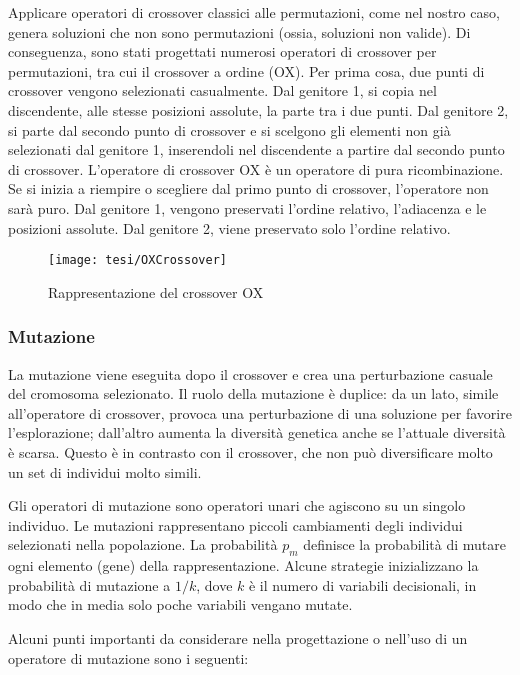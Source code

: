 Applicare operatori di crossover classici alle permutazioni, come nel nostro caso, genera soluzioni che non sono permutazioni (ossia, soluzioni non valide). Di conseguenza, sono stati progettati numerosi operatori di crossover per permutazioni, tra cui il crossover a ordine (OX). Per prima cosa, due punti di crossover vengono selezionati casualmente. Dal genitore 1, si copia nel discendente, alle stesse posizioni assolute, la parte tra i due punti. Dal genitore 2, si parte dal secondo punto di crossover e si scelgono gli elementi non già selezionati dal genitore 1, inserendoli nel discendente a partire dal secondo punto di crossover. L'operatore di crossover OX è un operatore di pura ricombinazione. Se si inizia a riempire o scegliere dal primo punto di crossover, l'operatore non sarà puro. Dal genitore 1, vengono preservati l'ordine relativo, l'adiacenza e le posizioni assolute. Dal genitore 2, viene preservato solo l'ordine relativo.

\begin{figure}[!ht] 
    \centering 
    \texttt{[image: tesi/OXCrossover]} 
    \caption{Rappresentazione del crossover OX}
\end{figure}

\subsubsection{Mutazione}
La mutazione viene eseguita dopo il crossover e crea una perturbazione casuale del cromosoma selezionato. Il ruolo della mutazione è duplice: da un lato, simile all'operatore di crossover, provoca una perturbazione di una soluzione per favorire l'esplorazione; dall'altro aumenta la diversità genetica anche se l'attuale diversità è scarsa. Questo è in contrasto con il crossover, che non può diversificare molto un set di individui molto simili.

Gli operatori di mutazione sono operatori unari che agiscono su un singolo individuo. Le mutazioni rappresentano piccoli cambiamenti degli individui selezionati nella popolazione. La probabilità $p_m$ definisce la probabilità di mutare ogni elemento (gene) della rappresentazione. Alcune strategie inizializzano la probabilità di mutazione a $1/k$, dove $k$ è il numero di variabili decisionali, in modo che in media solo poche variabili vengano mutate.

Alcuni punti importanti da considerare nella progettazione o nell'uso di un operatore di mutazione sono i seguenti:

